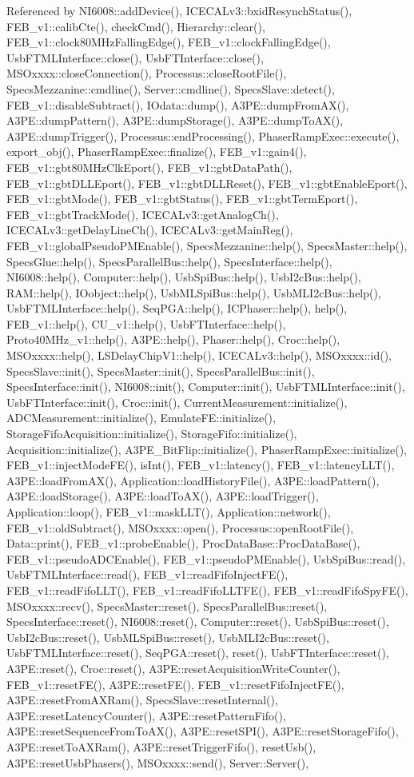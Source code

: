 Referenced by NI6008::addDevice(), ICECALv3::bxidResynchStatus(), FEB\_\-v1::calibCte(), checkCmd(), Hierarchy::clear(), FEB\_\-v1::clock80MHzFallingEdge(), FEB\_\-v1::clockFallingEdge(), UsbFTMLInterface::close(), UsbFTInterface::close(), MSOxxxx::closeConnection(), Processus::closeRootFile(), SpecsMezzanine::cmdline(), Server::cmdline(), SpecsSlave::detect(), FEB\_\-v1::disableSubtract(), IOdata::dump(), A3PE::dumpFromAX(), A3PE::dumpPattern(), A3PE::dumpStorage(), A3PE::dumpToAX(), A3PE::dumpTrigger(), Processus::endProcessing(), PhaserRampExec::execute(), export\_\-obj(), PhaserRampExec::finalize(), FEB\_\-v1::gain4(), FEB\_\-v1::gbt80MHzClkEport(), FEB\_\-v1::gbtDataPath(), FEB\_\-v1::gbtDLLEport(), FEB\_\-v1::gbtDLLReset(), FEB\_\-v1::gbtEnableEport(), FEB\_\-v1::gbtMode(), FEB\_\-v1::gbtStatus(), FEB\_\-v1::gbtTermEport(), FEB\_\-v1::gbtTrackMode(), ICECALv3::getAnalogCh(), ICECALv3::getDelayLineCh(), ICECALv3::getMainReg(), FEB\_\-v1::globalPseudoPMEnable(), SpecsMezzanine::help(), SpecsMaster::help(), SpecsGlue::help(), SpecsParallelBus::help(), SpecsInterface::help(), NI6008::help(), Computer::help(), UsbSpiBus::help(), UsbI2cBus::help(), RAM::help(), IOobject::help(), UsbMLSpiBus::help(), UsbMLI2cBus::help(), UsbFTMLInterface::help(), SeqPGA::help(), ICPhaser::help(), help(), FEB\_\-v1::help(), CU\_\-v1::help(), UsbFTInterface::help(), Proto40MHz\_\-v1::help(), A3PE::help(), Phaser::help(), Croc::help(), MSOxxxx::help(), LSDelayChipV1::help(), ICECALv3::help(), MSOxxxx::id(), SpecsSlave::init(), SpecsMaster::init(), SpecsParallelBus::init(), SpecsInterface::init(), NI6008::init(), Computer::init(), UsbFTMLInterface::init(), UsbFTInterface::init(), Croc::init(), CurrentMeasurement::initialize(), ADCMeasurement::initialize(), EmulateFE::initialize(), StorageFifoAcquisition::initialize(), StorageFifo::initialize(), Acquisition::initialize(), A3PE\_\-BitFlip::initialize(), PhaserRampExec::initialize(), FEB\_\-v1::injectModeFE(), isInt(), FEB\_\-v1::latency(), FEB\_\-v1::latencyLLT(), A3PE::loadFromAX(), Application::loadHistoryFile(), A3PE::loadPattern(), A3PE::loadStorage(), A3PE::loadToAX(), A3PE::loadTrigger(), Application::loop(), FEB\_\-v1::maskLLT(), Application::network(), FEB\_\-v1::oldSubtract(), MSOxxxx::open(), Processus::openRootFile(), Data::print(), FEB\_\-v1::probeEnable(), ProcDataBase::ProcDataBase(), FEB\_\-v1::pseudoADCEnable(), FEB\_\-v1::pseudoPMEnable(), UsbSpiBus::read(), UsbFTMLInterface::read(), FEB\_\-v1::readFifoInjectFE(), FEB\_\-v1::readFifoLLT(), FEB\_\-v1::readFifoLLTFE(), FEB\_\-v1::readFifoSpyFE(), MSOxxxx::recv(), SpecsMaster::reset(), SpecsParallelBus::reset(), SpecsInterface::reset(), NI6008::reset(), Computer::reset(), UsbSpiBus::reset(), UsbI2cBus::reset(), UsbMLSpiBus::reset(), UsbMLI2cBus::reset(), UsbFTMLInterface::reset(), SeqPGA::reset(), reset(), UsbFTInterface::reset(), A3PE::reset(), Croc::reset(), A3PE::resetAcquisitionWriteCounter(), FEB\_\-v1::resetFE(), A3PE::resetFE(), FEB\_\-v1::resetFifoInjectFE(), A3PE::resetFromAXRam(), SpecsSlave::resetInternal(), A3PE::resetLatencyCounter(), A3PE::resetPatternFifo(), A3PE::resetSequenceFromToAX(), A3PE::resetSPI(), A3PE::resetStorageFifo(), A3PE::resetToAXRam(), A3PE::resetTriggerFifo(), resetUsb(), A3PE::resetUsbPhasers(), MSOxxxx::send(), Server::Server(), 